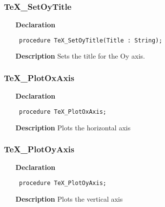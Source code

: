 \documentclass[12pt,a4paper,oneside]{report}
\newcommand{\declarationitem}[1]{\textbf{#1}}
\newcommand{\descriptiontitle}[1]{\textbf{#1}}
\newcommand{\code}[1]{\texttt{#1}}
\begin{document}
\subsubsection{TeX{\_}SetOyTitle}
\label{utexplot-TeX_SetOyTitle}
\begin{itemize}\item[\declarationitem{Declaration}\hfill]
	\begin{flushleft}
		\code{
			procedure TeX{\_}SetOyTitle(Title : String);}
		
	\end{flushleft}
	
	\par
	\item[\descriptiontitle{Description}]
	Sets the title for the Oy axis.
	
\end{itemize}
\subsubsection{TeX{\_}PlotOxAxis}
\label{utexplot-TeX_PlotOxAxis}
\begin{itemize}\item[\declarationitem{Declaration}\hfill]
	\begin{flushleft}
		\code{
			procedure TeX{\_}PlotOxAxis;}
		
	\end{flushleft}
	
	\par
	\item[\descriptiontitle{Description}]
	Plots the horizontal axis
	
\end{itemize}
\subsubsection{TeX{\_}PlotOyAxis}
\label{utexplot-TeX_PlotOyAxis}
\begin{itemize}\item[\declarationitem{Declaration}\hfill]
	\begin{flushleft}
		\code{
			procedure TeX{\_}PlotOyAxis;}
		
	\end{flushleft}
	
	\par
	\item[\descriptiontitle{Description}]
	Plots the vertical axis
	
\end{itemize}
\end{document}
